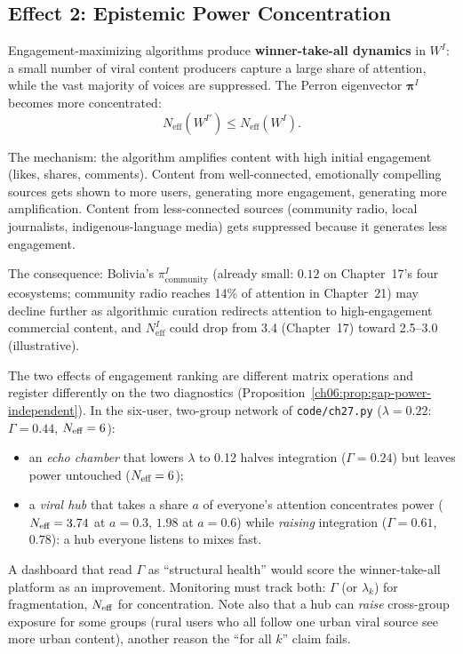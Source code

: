 \documentclass[../structural_economics_book.tex]{subfiles}
\begin{document}
\subsection{Effect 2: Epistemic Power Concentration}

\begin{conjecture}\label{ch27:prop:concentration}
Engagement-maximizing algorithms produce \textbf{winner-take-all dynamics} in $W^I$: a small number of viral content producers capture a large share of attention, while the vast majority of voices are suppressed. The Perron eigenvector $\boldsymbol{\pi}^I$ becomes more concentrated:
\begin{equation}\label{ch27:eq:concentration}
N_{\text{eff}}(W^{I'}) \leq N_{\text{eff}}(W^I).
\end{equation}

The mechanism: the algorithm amplifies content with high initial engagement (likes, shares, comments). Content from well-connected, emotionally compelling sources gets shown to more users, generating more engagement, generating more amplification. Content from less-connected sources (community radio, local journalists, indigenous-language media) gets suppressed because it generates less engagement.

The consequence: Bolivia's $\pi^I_{\text{community}}$ (already small: $0.12$ on Chapter~17's four ecosystems; community radio reaches 14\% of attention in Chapter~21) may decline further as algorithmic curation redirects attention to high-engagement commercial content, and $N_{\text{eff}}^I$ could drop from 3.4 (Chapter~17) toward 2.5--3.0 (illustrative).
\end{conjecture}

\begin{remark}\label{ch27:rem:gap_neff}
The two effects of engagement ranking are different matrix operations and register differently on the two diagnostics (Proposition~\ref{ch06:prop:gap-power-independent}). In the six-user, two-group network of \texttt{code/ch27.py} ($\lambda = 0.22$: $\Gamma = 0.44$, $N_{\text{eff}} = 6$):
\begin{itemize}
\item an \emph{echo chamber} that lowers $\lambda$ to 0.12 halves integration ($\Gamma = 0.24$) but leaves power untouched ($N_{\text{eff}} = 6$);
\item a \emph{viral hub} that takes a share $a$ of everyone's attention concentrates power ($N_{\text{eff}} = 3.74$ at $a = 0.3$, $1.98$ at $a = 0.6$) while \emph{raising} integration ($\Gamma = 0.61$, $0.78$): a hub everyone listens to mixes fast.
\end{itemize}
A dashboard that read $\Gamma$ as ``structural health'' would score the winner-take-all platform as an improvement. Monitoring must track both: $\Gamma$ (or $\lambda_k$) for fragmentation, $N_{\text{eff}}$ for concentration. Note also that a hub can \emph{raise} cross-group exposure for some groups (rural users who all follow one urban viral source see more urban content), another reason the ``for all $k$'' claim fails.
\end{remark}
\end{document}
